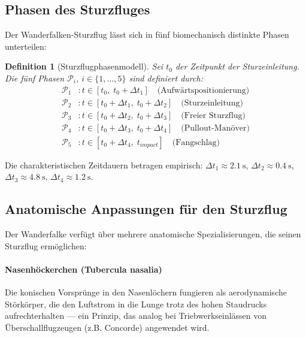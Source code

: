 ﻿\documentclass[12pt,a4paper]{article}
\newtheorem{definition}{Definition}[section]
\theoremstyle{remark}
\begin{document}
	\subsection{Phasen des Sturzfluges}
	
	Der Wanderfalken-Sturzflug lässt sich in fünf biomechanisch distinkte Phasen unterteilen:
	
	\begin{definition}[Sturzflugphasenmodell]
		\label{def:phasen}
		Sei $t_0$ der Zeitpunkt der Sturzeinleitung. Die fünf Phasen $\mathcal{P}_i$, $i \in \{1,\ldots,5\}$ sind definiert durch:
		\begin{align}
			\mathcal{P}_1 &: t \in [t_0,\; t_0 + \Delta t_1] \quad \text{(Aufwärtspositionierung)} \\
			\mathcal{P}_2 &: t \in [t_0 + \Delta t_1,\; t_0 + \Delta t_2] \quad \text{(Sturzeinleitung)} \\
			\mathcal{P}_3 &: t \in [t_0 + \Delta t_2,\; t_0 + \Delta t_3] \quad \text{(Freier Sturzflug)} \\
			\mathcal{P}_4 &: t \in [t_0 + \Delta t_3,\; t_0 + \Delta t_4] \quad \text{(Pullout-Manöver)} \\
			\mathcal{P}_5 &: t \in [t_0 + \Delta t_4,\; t_{impact}] \quad \text{(Fangschlag)}
		\end{align}
	\end{definition}
	
	Die charakteristischen Zeitdauern betragen empirisch: $\Delta t_1 \approx \SI{2.1}{\s}$, $\Delta t_2 \approx \SI{0.4}{\s}$, $\Delta t_3 \approx \SI{4.8}{\s}$, $\Delta t_4 \approx \SI{1.2}{\s}$.
	
	\subsection{Anatomische Anpassungen für den Sturzflug}
	
	Der Wanderfalke verfügt über mehrere anatomische Spezialisierungen, die seinen Sturzflug ermöglichen:
	
	\paragraph{Nasenhöckerchen (Tubercula nasalia)} Die konischen Vorsprünge in den Nasenlöchern fungieren als aerodynamische Störkörper, die den Luftstrom in die Lunge trotz des hohen Staudrucks aufrechterhalten --- ein Prinzip, das analog bei Triebwerkseinlässen von Überschallflugzeugen (z.B. Concorde) angewendet wird.
	
\end{document}

